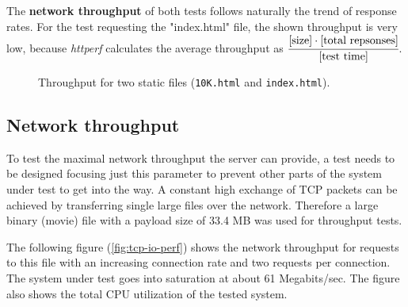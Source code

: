 The \textbf{network throughput} of both tests follows naturally the trend of response rates. For the test requesting the "index.html" file, the shown throughput is very low, because \textit{httperf} calculates the average throughput as $\cfrac{\text{[size]} \cdot \text{[total repsonses]}}{\text{[test time]}}$.
\vspace{1cm}

\begin{figure}[H]
	\centering
  \caption{Throughput for two static files (\texttt{10K.html} and \texttt{index.html}).}
  \label{fig:initial-req-io}
\end{figure}

\clearpage
\subsection{Network throughput}

To test the maximal network throughput the server can provide, a test needs to be designed focusing just this parameter to prevent other parts of the system under test to get into the way. A constant high exchange of TCP packets can be achieved by transferring single large files over the network. Therefore a large binary (movie) file with a payload size of 33.4 MB was used for throughput tests.

The following figure (\ref{fig:tcp-io-perf}) shows the network throughput for requests to this file with an increasing connection rate and two requests per connection. The system under test goes into saturation at about 61 Megabits/sec. The figure also shows the total CPU utilization of the tested system.


